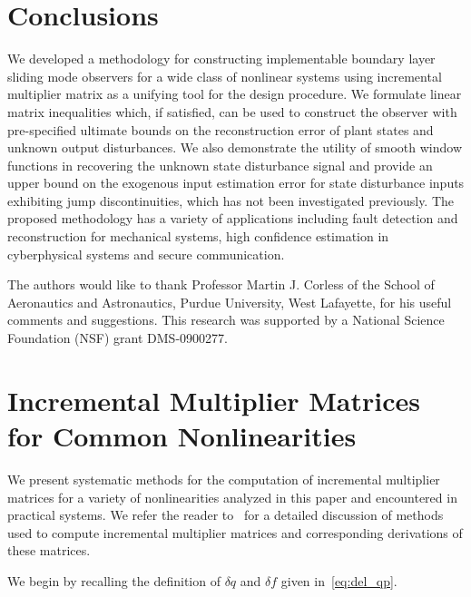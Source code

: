 \documentclass[times, doublespace]{rncauth}
\begin{document}
\section{Conclusions}\label{sec:conc}
We developed a methodology for constructing implementable boundary layer sliding mode observers for a wide class of nonlinear systems using incremental multiplier matrix as a unifying tool for the design procedure. We formulate linear matrix inequalities which, if satisfied, can be used to construct the observer with pre-specified ultimate bounds on the reconstruction error of plant states and unknown output disturbances. We also demonstrate the utility of smooth window functions in recovering the unknown state disturbance signal and provide an upper bound on the exogenous input estimation error for state disturbance inputs exhibiting jump discontinuities, which has not been investigated previously. The proposed methodology has a variety of applications including fault detection and reconstruction for mechanical systems, high confidence estimation in cyberphysical systems and secure communication.

\acks
The authors would like to thank Professor Martin J. Corless of the School of Aeronautics and Astronautics, Purdue University, West Lafayette, for his useful comments and suggestions.
This research was supported by a National Science Foundation (NSF) grant DMS-0900277.
\vspace{1em}


\appendix
\section{Incremental Multiplier Matrices for Common Nonlinearities}\label{app}
We present systematic methods for the computation of incremental multiplier matrices for a variety of nonlinearities analyzed in this paper and encountered in practical systems. We refer the reader to~\cite[Section 6]{iqs_corless} for a detailed discussion of methods used to compute incremental multiplier matrices and corresponding derivations of these matrices.

We begin by recalling the definition of $\delta q$ and $\delta f$ given in~\eqref{eq:del_qp}.
\end{document}
